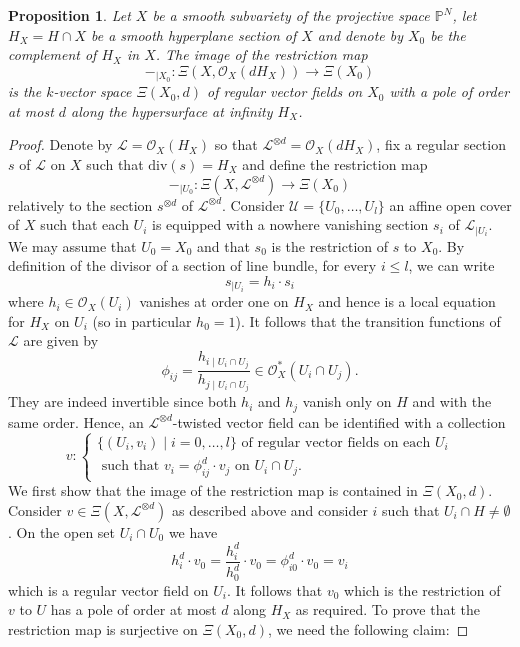 \documentclass[12pt]{amsart}
\renewcommand{\P}{\mathbb{P}}
\theoremstyle{definition}
\theoremstyle{plain}
\newtheorem{proposition}[definition]{Proposition}
\theoremstyle{exampstyle}
\theoremstyle{exampstyle}\newtheorem{thmxbis}{Theorem}
\numberwithin{equation}{section}
\theoremstyle{remark}
\begin{document}
\begin{proposition} \label{presentation- twisted-vector field-hyperplanesection}
Let $X$ be a smooth  subvariety of the projective space $\P^N$, let $H_X = H \cap X$ be a smooth hyperplane section of $X$ and denote by $X_0$ be the complement of $H_X$ in $X$. The image of the restriction map 
$$-_{\mid X_0}: \Xi(X,\mathcal O_X(dH_X)) \rightarrow  \Xi(X_0) $$
is the $k$-vector space $\Xi(X_0,d)$ of regular vector fields on $X_0$ with a pole of order at most $d$ along the hypersurface at infinity $H_X$.  
\end{proposition} 

\begin{proof}
Denote by $\mathcal L = \mathcal O_X(H_X)$ so that $\mathcal L^{\otimes d} = \mathcal O_X(dH_X)$, fix a regular section $s$ of $\mathcal L$ on $X$ such that $\mathrm{div}(s) = H_X$ and define the restriction map
$$-_{\mid U_0}: \Xi(X,\mathcal L^{\otimes d}) \rightarrow \Xi(X_0)$$
relatively to the section $s^{\otimes d}$ of $\mathcal L^{\otimes d}$. Consider $\mathcal U = \lbrace U_0,\ldots, U_l \rbrace$ an affine open cover of $X$ such that each $U_i$ is equipped with a nowhere vanishing section $s_i$ of $\mathcal L_{\mid U_i}$. We may assume that $U_0 = X_0$ and that $s_0$ is the restriction of $s$ to $X_0$. By definition of the divisor of a section of line bundle, for every $i \leq l$, we can write 
$$ s_{\mid U_i} = h_i \cdot s_i$$ 
where $h_i \in \mathcal O_X(U_i)$ vanishes at order one on $H_X$ and hence is a local equation for $H_X$ on $U_i$ (so in particular $h_0 = 1$). It follows that the transition functions of $\mathcal L$ are given by 
$$\phi_{ij} = \frac {h_{i \mid U_i \cap U_j}} {h_{j \mid U_i \cap U_j}} \in \mathcal O^\ast _X(U_i \cap U_j).$$
They are indeed invertible since both $h_i$ and $h_j$ vanish only on $H$ and with the same order. Hence, an $\mathcal L^{\otimes d}$-twisted vector field can be identified with a collection 
$$ v:  \begin{cases} \lbrace (U_i,v_i) \mid i = 0,\ldots, l \rbrace \text{ of regular vector fields on each }U_i \\ 
\text{ such that } v_i = \phi_{ij}^d \cdot v_j \text{ on } U_i \cap U_j. \end{cases}
$$
We first show that the image of the restriction map is contained in $\Xi(X_0,d)$. Consider $v \in \Xi(X, \mathcal L^{\otimes d})$ as described above and consider $i$ such that $U_i \cap H \neq \emptyset$. On the open set $U_i \cap U_0$ we have 
$$h_i^d \cdot v_0 = \frac {h_i^d} {h_0^d} \cdot v_0 = \phi_{i0}^d \cdot v_0 = v_i$$
which is a regular vector field on $U_i$. It follows that $v_0$ which is the restriction of $v$ to $U$ has a pole of order at most $d$ along $H_X$ as required. To prove that the restriction map is surjective on $\Xi(X_0,d)$, we need the following claim: 


\end{proof}
\end{document}
